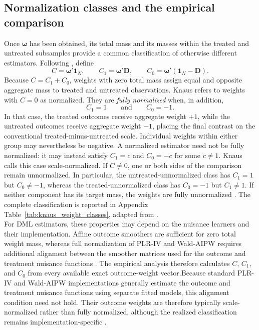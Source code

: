 \documentclass[12pt, a4paper, oneside]{article}
\theoremstyle{plain}
\theoremstyle{definition}
\begin{document}
\subsection{Normalization classes and the empirical comparison}
\label{subsec:knaus_normalization}


Once \(\boldsymbol{\omega}\) has been obtained, its total mass and its masses
within the treated and untreated subsamples provide a common classification of
otherwise different estimators. Following \citet[Table~4]{knaus2024treatment},
define
\begin{equation}
    C=\boldsymbol{\omega}'\mathbf 1_N,
    \qquad
    C_1=\boldsymbol{\omega}'\mathbf D,
    \qquad
    C_0=\boldsymbol{\omega}'(\mathbf 1_N-\mathbf D).
    \label{eq:knaus_weight_masses}
\end{equation}
Because \(C=C_1+C_0\), weights with zero total mass assign equal and opposite
aggregate mass to treated and untreated observations. Knaus refers to weights
with \(C=0\) as normalized. They are \emph{fully normalized} when, in addition,
\begin{equation}
    C_1=1
    \qquad\text{and}\qquad
    C_0=-1.
    \label{eq:knaus_full_normalization}
\end{equation}
In that case, the treated outcomes receive aggregate weight \(+1\), while
the untreated outcomes receive aggregate weight \(-1\), placing the final
contrast on the conventional treated-minus-untreated scale. Individual
weights within either group may nevertheless be negative.
A normalized estimator need not
be fully normalized: it may instead satisfy \(C_1=c\) and \(C_0=-c\) for some
\(c\neq1\). Knaus calls this case scale-normalized. If \(C\neq0\), one or both
sides of the comparison remain unnormalized. In particular, the
untreated-unnormalized class has \(C_1=1\) but \(C_0\neq-1\), whereas the
treated-unnormalized class has \(C_0=-1\) but \(C_1\neq1\). If neither component
has its target mass, the weights are fully unnormalized
\citep[Section~4.1]{knaus2024treatment}.
The complete classification is reported in Appendix
Table~\ref{tab:knaus_weight_classes}, adapted from
\citet[Table~4]{knaus2024treatment}.\\
For DML estimators, these properties may depend on the nuisance learners and
their implementation. Affine outcome smoothers are sufficient for zero total
weight mass, whereas full normalization of PLR-IV and Wald-AIPW requires
additional alignment between the smoother matrices used for the outcome and
treatment nuisance functions
\citep[Sections~4.2.2 and 4.2.4]{knaus2024treatment}. The empirical analysis
therefore calculates \(C\), \(C_1\), and \(C_0\) from every available exact
outcome-weight vector.Because standard PLR-IV and Wald-AIPW implementations generally estimate the
outcome and treatment nuisance functions using separate fitted models, this
alignment condition need not hold. Their outcome weights are therefore
typically scale-normalized rather than fully normalized, although the realized
classification remains implementation-specific
\citep[Sections~4.2.2 and 4.2.4]{knaus2024treatment}.
\end{document}
